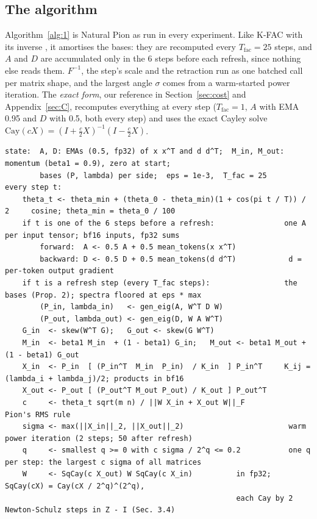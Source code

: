 \documentclass{article}
\begin{document}
\subsection{The algorithm}\label{sec:algorithm}

Algorithm~\ref{alg:1} is Natural Pion as run in every experiment. Like K-FAC with its inverse
\citep[][Sec.~13]{martens2015kfac}, it amortises the bases: they are recomputed every \(T_{\mathrm{fac}} = 25\) steps,
and \(A\) and \(D\) are accumulated only in the 6 steps before each refresh, since nothing else reads them.
\(F^{-1}\), the step's scale and the retraction run as one batched call per matrix shape, and the largest angle
\(\sigma\) comes from a warm-started power iteration. The \emph{exact form}, our reference in Section~\ref{sec:cost} and
Appendix~\ref{sec:C}, recomputes everything at every step (\(T_{\mathrm{fac}} = 1\), \(A\) with EMA 0.95 and \(D\) with
0.5, both every step) and uses the exact Cayley solve \(\mathrm{Cay}(cX) = (I + \tfrac c2 X)^{-1}(I - \tfrac c2 X)\).

\begin{algorithm*}[t]
\caption{Natural Pion, for one rotated matrix \(W \in \mathbb{R}^{m\times n}\) (all of them processed alike, batched by shape).}\label{alg:1}
\vspace{-0.5em}
\scriptsize
\begin{verbatim}
state:  A, D: EMAs (0.5, fp32) of x x^T and d d^T;  M_in, M_out: momentum (beta1 = 0.9), zero at start;
        bases (P, lambda) per side;  eps = 1e-3,  T_fac = 25
every step t:
    theta_t <- theta_min + (theta_0 - theta_min)(1 + cos(pi t / T)) / 2     cosine; theta_min = theta_0 / 100
    if t is one of the 6 steps before a refresh:                one A per input tensor; bf16 inputs, fp32 sums
        forward:  A <- 0.5 A + 0.5 mean_tokens(x x^T)
        backward: D <- 0.5 D + 0.5 mean_tokens(d d^T)            d = per-token output gradient
    if t is a refresh step (every T_fac steps):                 the bases (Prop. 2); spectra floored at eps * max
        (P_in, lambda_in)   <- gen_eig(A, W^T D W)
        (P_out, lambda_out) <- gen_eig(D, W A W^T)
    G_in  <- skew(W^T G);   G_out <- skew(G W^T)
    M_in  <- beta1 M_in  + (1 - beta1) G_in;   M_out <- beta1 M_out + (1 - beta1) G_out
    X_in  <- P_in  [ (P_in^T  M_in  P_in)  / K_in  ] P_in^T     K_ij = (lambda_i + lambda_j)/2; products in bf16
    X_out <- P_out [ (P_out^T M_out P_out) / K_out ] P_out^T
    c     <- theta_t sqrt(m n) / ||W X_in + X_out W||_F          Pion's RMS rule
    sigma <- max(||X_in||_2, ||X_out||_2)                        warm power iteration (2 steps; 50 after refresh)
    q     <- smallest q >= 0 with c sigma / 2^q <= 0.2           one q per step: the largest c sigma of all matrices
    W     <- SqCay(c X_out) W SqCay(c X_in)          in fp32; SqCay(cX) = Cay(cX / 2^q)^(2^q),
                                                     each Cay by 2 Newton-Schulz steps in Z - I (Sec. 3.4)
\end{verbatim}
\end{algorithm*}
\end{document}
